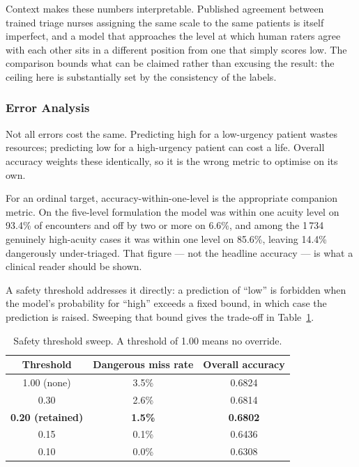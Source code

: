 Context makes these numbers interpretable. Published agreement between trained triage nurses
assigning the same scale to the same patients is itself imperfect, and a model that approaches
the level at which human raters agree with each other sits in a different position from one
that simply scores low. The comparison bounds what can be claimed rather than excusing the
result: the ceiling here is substantially set by the consistency of the labels.

\subsubsection{Error Analysis}
\label{subsec:triage-error}

Not all errors cost the same. Predicting high for a low-urgency patient wastes resources;
predicting low for a high-urgency patient can cost a life. Overall accuracy weights these
identically, so it is the wrong metric to optimise on its own.

For an ordinal target, accuracy-within-one-level is the appropriate companion metric. On the
five-level formulation the model was within one acuity level on 93.4\% of encounters and off by
two or more on 6.6\%, and among the 1\,734 genuinely high-acuity cases it was within one level
on 85.6\%, leaving 14.4\% dangerously under-triaged. That figure --- not the headline accuracy
--- is what a clinical reader should be shown.

A safety threshold addresses it directly: a prediction of ``low'' is forbidden when the model's
probability for ``high'' exceeds a fixed bound, in which case the prediction is raised. Sweeping
that bound gives the trade-off in Table~\ref{tab:triage-threshold}.

\begin{table}[H]
  \centering
  \small
  \caption{Safety threshold sweep. A threshold of 1.00 means no override.}
  \label{tab:triage-threshold}
  \begin{tabular}{@{}ccc@{}}
    \toprule
    Threshold & Dangerous miss rate & Overall accuracy \\
    \midrule
    1.00 (none) & 3.5\% & 0.6824 \\
    0.30 & 2.6\% & 0.6814 \\
    \textbf{0.20 (retained)} & \textbf{1.5\%} & \textbf{0.6802} \\
    0.15 & 0.1\% & 0.6436 \\
    0.10 & 0.0\% & 0.6308 \\
    \bottomrule
  \end{tabular}
\end{table}

